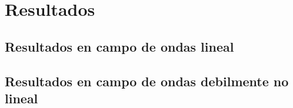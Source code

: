 \chapter{Resultados}
\label{ch:resultados}

\section{Resultados en campo de ondas lineal}

\section{Resultados en campo de ondas debilmente no lineal}
